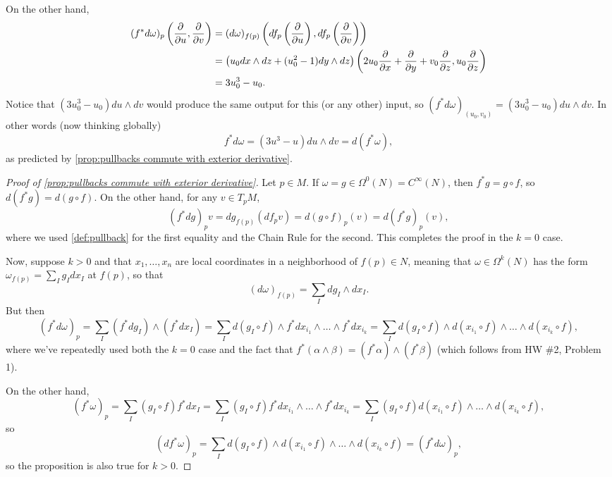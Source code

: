 \begin{example}
	On the other hand,
	\begin{align*}
		(f^\ast d\omega)_{p}\left(\frac{\partial}{\partial u}, \frac{\partial}{\partial v}\right) & = (d\omega)_{f(p)} \left(df_{p}\left(\frac{\partial}{\partial u}\right), df_p\left(\frac{\partial}{\partial v}\right)\right) \\
		 & = \left(\vphantom{x^2}u_0 dx \wedge dz + (u_0^2-1) dy \wedge dz\right)\left(2u_0 \frac{\partial}{\partial x} + \frac{\partial}{\partial y} + v_0\frac{\partial}{\partial z}, u_0\frac{\partial}{\partial z}\right) \\
		 & = 3u_0^3 -u_0.
	\end{align*}
	Notice that $(3u_0^3 -u_0)du \wedge dv $ would produce the same output for this (or any other) input, so $(f^\ast d\omega)_{(u_0,v_0)}= (3u_0^3 -u_0)du \wedge dv$. In other words (now thinking globally)
	\[
		f^\ast d\omega = (3u^3-u)du \wedge dv = d(f^\ast \omega),
	\]
	as predicted by \cref{prop:pullbacks commute with exterior derivative}.
\end{example}

\begin{proof}[Proof of \cref{prop:pullbacks commute with exterior derivative}]
	 Let $p \in M$. If $\omega = g\in \Omega^0(N) = C^\infty(N)$, then $f^\ast g = g \circ f$, so $d(f^\ast g ) = d(g \circ f)$. On the other hand, for any $v \in T_pM$, 
	 \[
	 	(f^\ast dg)_pv = dg_{f(p)}(df_p v) = d(g \circ f)_p(v) = d(f^\ast g)_p(v),
	 \]
	 where we used \cref{def:pullback} for the first equality and the Chain Rule for the second. This completes the proof in the $k=0$ case.
	 
	 Now, suppose $k > 0$ and that $x_1, \dots , x_n$ are local coordinates in a neighborhood of $f(p) \in N$, meaning that $\omega \in \Omega^k(N)$ has the form $\omega_{f(p)} = \sum_I g_I dx_I$ at $f(p)$, so that
	 \[
	 	(d\omega)_{f(p)} = \sum_I dg_I \wedge dx_I.
	 \]
	 But then
	 \[
	 	(f^\ast d\omega)_p = \sum_I (f^\ast dg_I) \wedge (f^\ast dx_I) = \sum_I d(g_I \circ f) \wedge f^\ast dx_{i_1} \wedge \dots \wedge f^\ast dx_{i_k} = \sum_I d(g_I \circ f) \wedge d(x_{i_1} \circ f) \wedge \dots \wedge d(x_{i_k} \circ f),
	 \]
	 where we've repeatedly used both the $k=0$ case and the fact that $f^\ast(\alpha \wedge \beta) = (f^\ast \alpha) \wedge (f^\ast \beta)$ (which follows from HW \#2, Problem 1).
	 
	 On the other hand,
	 \[
	 	(f^\ast\omega)_p = \sum_I (g_I \circ f) f^\ast dx_I = \sum_I (g_I \circ f) f^\ast dx_{i_1} \wedge \dots \wedge f^\ast dx_{i_k} = \sum_I (g_I \circ f) d (x_{i_1} \circ f) \wedge \dots \wedge d(x_{i_k} \circ f),
	 \]
	 so
	 \[
	 	(df^\ast \omega)_p = \sum_I d(g_I \circ f) \wedge d (x_{i_1} \circ f) \wedge \dots \wedge d(x_{i_k} \circ f) = (f^\ast d\omega)_p,
	 \]
	 so the proposition is also true for $k>0$.
\end{proof}